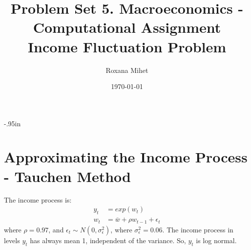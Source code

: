 \documentclass[letter,11pt]{article}
\begin{document}
 
\oddsidemargin 0.2in \topmargin -.95in 
\title{Problem Set 5. Macroeconomics - Computational Assignment \\
Income Fluctuation Problem} 
\date{\today}
\author{Roxana Mihet}
\maketitle

\section{Approximating the Income Process - Tauchen Method}
\hfill

The income process is:
\begin{align*}
y_t &= exp(w_t) \\
w_t &= \bar{w} + \rho w_{t-1} + \epsilon_t
\end{align*}
where $\rho = 0.97$, and $\epsilon_t \sim N(0, \sigma_{\epsilon}^2)$, where $ \sigma_{\epsilon}^2=0.06$. The income process in levels $y_t$ has always mean 1, independent of the variance. So, $y_t$ is log normal.
\end{document}
